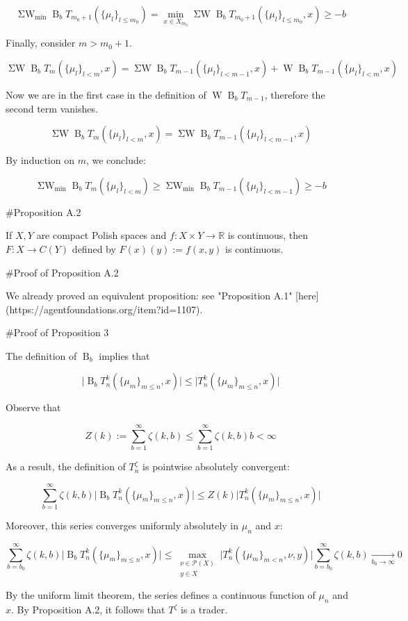 \documentclass[a4paper]{article}
\newcommand{\Reals}{\mathbb{R}}
\newcommand{\Abs}[1]{\lvert #1 \rvert}
\newcommand{\Prob}{\mathcal{P}}
\newcommand{\B}{\operatorname{B}_b}
\newcommand{\W}{\operatorname{W}}
\newcommand{\SW}{\operatorname{\Sigma W}}
\newcommand{\SWm}{\operatorname{\Sigma W}_{\min}}
\begin{document}
$$\SWm \B T_{m_0+1}(\{\mu_l \}_{l \leq m_0}) = \min_{x \in X_{m_0}} \SW \B T_{m_0+1}(\{\mu_l \}_{l \leq m_0},x) \geq -b$$

Finally, consider ${m > m_0 + 1}$.

$$\SW \B T_{m}(\{\mu_l \}_{l < m},x) = \SW \B T_{m - 1}(\{\mu_l \}_{l < m - 1},x) + \W \B T_{m-1}(\{\mu_l \}_{l < m},x)$$

Now we are in the first case in the definition of ${\W \B T_{m-1}}$, therefore the second term vanishes.

$$\SW \B T_{m}(\{\mu_l \}_{l < m},x) = \SW \B T_{m - 1}(\{\mu_l \}_{l < m - 1},x)$$

By induction on ${m}$, we conclude:

$$\SWm \B T_{m}(\{\mu_l \}_{l < m}) \geq \SWm \B T_{m - 1}(\{\mu_l \}_{l < m - 1}) \geq -b$$

\#Proposition A.2

If ${X,Y}$ are compact Polish spaces and ${f: X \times Y \rightarrow \Reals}$ is continuous, then ${F: X \rightarrow C(Y)}$ defined by ${F(x)(y):=f(x,y)}$ is continuous.

\#Proof of Proposition A.2

We already proved an equivalent proposition: see "Proposition A.1" [here](https://agentfoundations.org/item?id=1107).

\#Proof of Proposition 3

The definition of ${\B}$ implies that

$$\Abs{\B T^k_n(\{\mu_m \}_{m \leq n},x)} \leq \Abs{T^k_n(\{\mu_m \}_{m \leq n},x)}$$

Observe that

$$Z(k):=\sum_{b=1}^\infty \zeta(k,b) \leq \sum_{b=1}^\infty \zeta(k,b)b < \infty$$

As a result, the definition of ${T^\zeta_n}$ is pointwise absolutely convergent:

$$ \sum_{b=1}^\infty \zeta(k,b) \Abs{\B T^k_n(\{\mu_m \}_{m \leq n},x)} \leq Z(k) \Abs{T^k_n(\{\mu_m \}_{m \leq n},x)}$$

Moreover, this series converges uniformly absolutely in ${\mu_n}$ and ${x}$:

$$ \sum_{b=b_0}^\infty \zeta(k,b) \Abs{\B T^k_n(\{\mu_m \}_{m \leq n},x)} \leq \max_{\substack{\nu \in \Prob(X) \\ y \in X}} \Abs{T^k_n(\{\mu_m \}_{m < n},\nu,y)}\sum_{b=b_0}^\infty \zeta(k,b) \underset{b_0 \rightarrow \infty}{\rightarrow} 0$$

By the uniform limit theorem, the series defines a continuous function of ${\mu_n}$ and ${x}$. By Proposition A.2, it follows that ${T^\zeta}$ is a trader.
\end{document}
